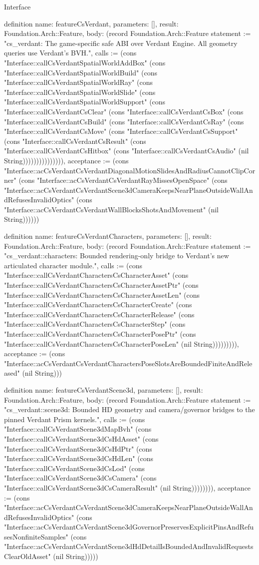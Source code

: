 \begin{lexlean}{Interface}
\begin{semanticmodule}
definition{
  name: featureCsVerdant,
  parameters: [],
  result: Foundation.Arch::Feature,
  body: (record Foundation.Arch::Feature {statement := "cs_verdant: The game-specific safe ABI over Verdant Engine. All geometry queries use Verdant's BVH.", calls := (cons "Interface::callCsVerdantSpatialWorldAddBox" (cons "Interface::callCsVerdantSpatialWorldBuild" (cons "Interface::callCsVerdantSpatialWorldRay" (cons "Interface::callCsVerdantSpatialWorldSlide" (cons "Interface::callCsVerdantSpatialWorldSupport" (cons "Interface::callCsVerdantCsClear" (cons "Interface::callCsVerdantCsBox" (cons "Interface::callCsVerdantCsBuild" (cons "Interface::callCsVerdantCsRay" (cons "Interface::callCsVerdantCsMove" (cons "Interface::callCsVerdantCsSupport" (cons "Interface::callCsVerdantCsResult" (cons "Interface::callCsVerdantCsHitbox" (cons "Interface::callCsVerdantCsAudio" (nil String))))))))))))))), acceptance := (cons "Interface::acCsVerdantCsVerdantDiagonalMotionSlidesAndRadiusCannotClipCorner" (cons "Interface::acCsVerdantCsVerdantRayMissesOpenSpace" (cons "Interface::acCsVerdantCsVerdantScene3dCameraKeepsNearPlaneOutsideWallAndRefusesInvalidOptics" (cons "Interface::acCsVerdantCsVerdantWallBlocksShotsAndMovement" (nil String)))))})
}

definition{
  name: featureCsVerdantCharacters,
  parameters: [],
  result: Foundation.Arch::Feature,
  body: (record Foundation.Arch::Feature {statement := "cs_verdant::characters: Bounded rendering-only bridge to Verdant's new articulated character module.", calls := (cons "Interface::callCsVerdantCharactersCsCharacterAsset" (cons "Interface::callCsVerdantCharactersCsCharacterAssetPtr" (cons "Interface::callCsVerdantCharactersCsCharacterAssetLen" (cons "Interface::callCsVerdantCharactersCsCharacterCreate" (cons "Interface::callCsVerdantCharactersCsCharacterRelease" (cons "Interface::callCsVerdantCharactersCsCharacterStep" (cons "Interface::callCsVerdantCharactersCsCharacterPosePtr" (cons "Interface::callCsVerdantCharactersCsCharacterPoseLen" (nil String))))))))), acceptance := (cons "Interface::acCsVerdantCsVerdantCharactersPoseSlotsAreBoundedFiniteAndReleased" (nil String))})
}

definition{
  name: featureCsVerdantScene3d,
  parameters: [],
  result: Foundation.Arch::Feature,
  body: (record Foundation.Arch::Feature {statement := "cs_verdant::scene3d: Bounded HD geometry and camera/governor bridges to the pinned Verdant Prism kernels.", calls := (cons "Interface::callCsVerdantScene3dMapBvh" (cons "Interface::callCsVerdantScene3dCsHdAsset" (cons "Interface::callCsVerdantScene3dCsHdPtr" (cons "Interface::callCsVerdantScene3dCsHdLen" (cons "Interface::callCsVerdantScene3dCsLod" (cons "Interface::callCsVerdantScene3dCsCamera" (cons "Interface::callCsVerdantScene3dCsCameraResult" (nil String)))))))), acceptance := (cons "Interface::acCsVerdantCsVerdantScene3dCameraKeepsNearPlaneOutsideWallAndRefusesInvalidOptics" (cons "Interface::acCsVerdantCsVerdantScene3dGovernorPreservesExplicitPinsAndRefusesNonfiniteSamples" (cons "Interface::acCsVerdantCsVerdantScene3dHdDetailIsBoundedAndInvalidRequestsClearOldAsset" (nil String))))})
}


\end{semanticmodule}
\end{lexlean}
